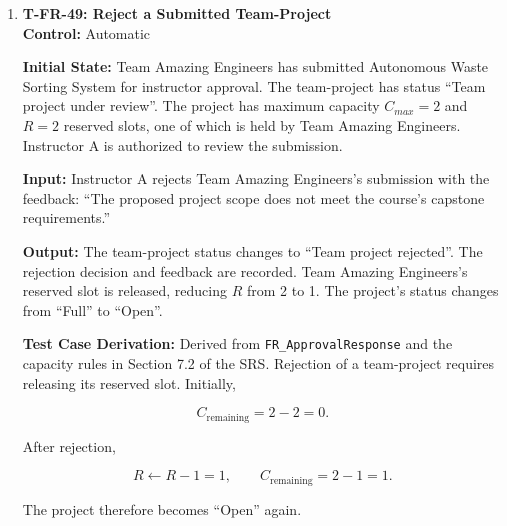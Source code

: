 \documentclass[12pt, titlepage]{article}
\begin{document}
\begin{enumerate}
\textbf{Output:} The revised information is saved, and the team-project returns to ``Team project submitted'' for instructor review. The previous feedback remains available, and the submission is not automatically approved.

\textbf{Test Case Derivation:} Derived from \texttt{FR\_RequestApproval} and \texttt{FR\_ApprovalResponse}. The SRS allows teams to modify and resubmit their information following instructor feedback. The revised submission must re-enter the review process rather than bypassing approval.

\textbf{How Test Will Be Performed:} Configure the change request and feedback. Using Playwright, authenticate as an authorized Team Amazing Engineers member, update the project objective, and resubmit. Verify the updated objective, submission status, and preservation of the previous feedback.

\item \label{T-FR-49}\textbf{T-FR-49: Reject a Submitted Team-Project}\\

\textbf{Control:} Automatic

\textbf{Initial State:} Team Amazing Engineers has submitted Autonomous Waste Sorting System for instructor approval. The team-project has status ``Team project under review''. The project has maximum capacity $C_{max} = 2$ and $R = 2$ reserved slots, one of which is held by Team Amazing Engineers. Instructor A is authorized to review the submission.

\textbf{Input:} Instructor A rejects Team Amazing Engineers's submission with the feedback: ``The proposed project scope does not meet the course's capstone requirements.''

\textbf{Output:} The team-project status changes to ``Team project rejected''. The rejection decision and feedback are recorded. Team Amazing Engineers's reserved slot is released, reducing $R$ from 2 to 1. The project's status changes from ``Full'' to ``Open''.

\textbf{Test Case Derivation:} Derived from \texttt{FR\_ApprovalResponse} and the capacity rules in Section 7.2 of the SRS. Rejection of a team-project requires releasing its reserved slot. Initially,

\[
C_{\text{remaining}}=2-2=0.
\]

After rejection,

\[
R \leftarrow R-1=1,
\qquad
C_{\text{remaining}}=2-1=1.
\]

The project therefore becomes ``Open'' again.


\end{enumerate}
\end{document}
